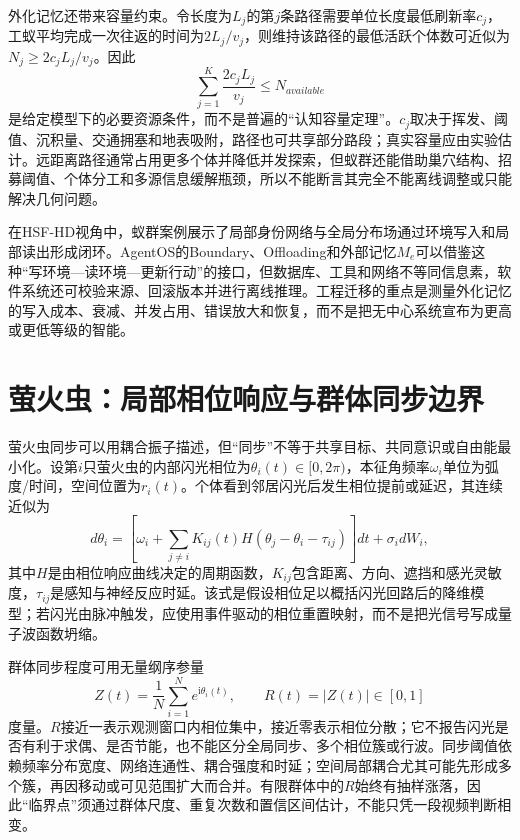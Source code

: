 \label{subsec:ant_capacity_limit}
外化记忆还带来容量约束。令长度为$L_j$的第$j$条路径需要单位长度最低刷新率$c_j$，工蚁平均完成一次往返的时间为$2L_j/v_j$，则维持该路径的最低活跃个体数可近似为$N_j\ge 2c_jL_j/v_j$。因此
\begin{equation}
 \sum_{j=1}^{K}\frac{2c_jL_j}{v_j}\le N_{available}
\end{equation}
是给定模型下的必要资源条件，而不是普遍的“认知容量定理”。$c_j$取决于挥发、阈值、沉积量、交通拥塞和地表吸附，路径也可共享部分路段；真实容量应由实验估计。远距离路径通常占用更多个体并降低并发探索，但蚁群还能借助巢穴结构、招募阈值、个体分工和多源信息缓解瓶颈，所以不能断言其完全不能离线调整或只能解决几何问题。

在HSF-HD视角中，蚁群案例展示了局部身份网络与全局分布场通过环境写入和局部读出形成闭环。AgentOS的Boundary、Offloading和外部记忆$M_e$可以借鉴这种“写环境—读环境—更新行动”的接口，但数据库、工具和网络不等同信息素，软件系统还可校验来源、回滚版本并进行离线推理。工程迁移的重点是测量外化记忆的写入成本、衰减、并发占用、错误放大和恢复，而不是把无中心系统宣布为更高或更低等级的智能。

\section{萤火虫：局部相位响应与群体同步边界}
\label{sec:firefly_synchronization_dynamics}

萤火虫同步可以用耦合振子描述，但“同步”不等于共享目标、共同意识或自由能最小化。设第$i$只萤火虫的内部闪光相位为$\theta_i(t)\in[0,2\pi)$，本征角频率$\omega_i$单位为弧度/时间，空间位置为$r_i(t)$。个体看到邻居闪光后发生相位提前或延迟，其连续近似为
\begin{equation}
 d\theta_i=\left[\omega_i+\sum_{j\ne i}K_{ij}(t)H(\theta_j-\theta_i-\tau_{ij})\right]dt+\sigma_i dW_i,
\end{equation}
其中$H$是由相位响应曲线决定的周期函数，$K_{ij}$包含距离、方向、遮挡和感光灵敏度，$\tau_{ij}$是感知与神经反应时延。该式是假设相位足以概括闪光回路后的降维模型；若闪光由脉冲触发，应使用事件驱动的相位重置映射，而不是把光信号写成量子波函数坍缩。

群体同步程度可用无量纲序参量
\begin{equation}
 Z(t)=\frac1N\sum_{i=1}^{N}e^{\mathrm i\theta_i(t)},\qquad R(t)=|Z(t)|\in[0,1]
\end{equation}
度量。$R$接近一表示观测窗口内相位集中，接近零表示相位分散；它不报告闪光是否有利于求偶、是否节能，也不能区分全局同步、多个相位簇或行波。同步阈值依赖频率分布宽度、网络连通性、耦合强度和时延；空间局部耦合尤其可能先形成多个簇，再因移动或可见范围扩大而合并。有限群体中的$R$始终有抽样涨落，因此“临界点”须通过群体尺度、重复次数和置信区间估计，不能只凭一段视频判断相变。

